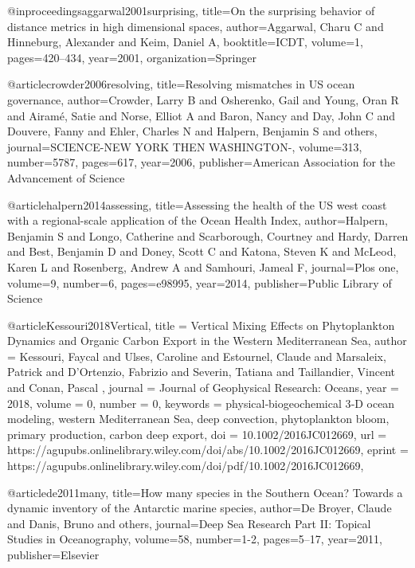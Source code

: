 {{{{{{{{{{{{@inproceedings{aggarwal2001surprising,
  title={On the surprising behavior of distance metrics in high dimensional spaces},
  author={Aggarwal, Charu C and Hinneburg, Alexander and Keim, Daniel A},
  booktitle={ICDT},
  volume={1},
  pages={420--434},
  year={2001},
  organization={Springer}
}

@article{crowder2006resolving,
  title={Resolving mismatches in US ocean governance},
  author={Crowder, Larry B and Osherenko, Gail and Young, Oran R and Airam{\'e}, Satie and Norse, Elliot A and Baron, Nancy and Day, John C and Douvere, Fanny and Ehler, Charles N and Halpern, Benjamin S and others},
  journal={SCIENCE-NEW YORK THEN WASHINGTON-},
  volume={313},
  number={5787},
  pages={617},
  year={2006},
  publisher={American Association for the Advancement of Science}
}

@article{halpern2014assessing,
  title={Assessing the health of the US west coast with a regional-scale application of the Ocean Health Index},
  author={Halpern, Benjamin S and Longo, Catherine and Scarborough, Courtney and Hardy, Darren and Best, Benjamin D and Doney, Scott C and Katona, Steven K and McLeod, Karen L and Rosenberg, Andrew A and Samhouri, Jameal F},
  journal={Plos one},
  volume={9},
  number={6},
  pages={e98995},
  year={2014},
  publisher={Public Library of Science}
}

@article{Kessouri2018Vertical,
title = {Vertical Mixing Effects on Phytoplankton Dynamics and Organic Carbon Export in the Western Mediterranean Sea},
author = {Kessouri, Faycal and Ulses, Caroline and Estournel, Claude and Marsaleix, Patrick and D'Ortenzio, Fabrizio and Severin, Tatiana  and Taillandier, Vincent and Conan, Pascal },
journal = {Journal of Geophysical Research: Oceans},
year = {2018},
volume = {0},
number = {0},
keywords = {physical‐biogeochemical 3‐D ocean modeling, western Mediterranean Sea, deep convection, phytoplankton bloom, primary production, carbon deep export},
doi = {10.1002/2016JC012669},
url = {https://agupubs.onlinelibrary.wiley.com/doi/abs/10.1002/2016JC012669},
eprint = {https://agupubs.onlinelibrary.wiley.com/doi/pdf/10.1002/2016JC012669},
}


@article{de2011many,
  title={How many species in the Southern Ocean? Towards a dynamic inventory of the Antarctic marine species},
  author={De Broyer, Claude and Danis, Bruno and others},
  journal={Deep Sea Research Part II: Topical Studies in Oceanography},
  volume={58},
  number={1-2},
  pages={5--17},
  year={2011},
  publisher={Elsevier}
}


}}}}}}}}}}}}
